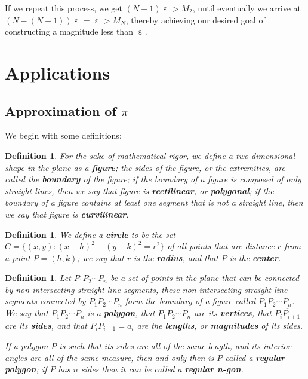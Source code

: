 \documentclass[letterpaper, 12pt]{amsart}
\DeclareMathOperator{\ep}{\varepsilon}
\newtheorem{defn}[thm]{Definition}
\theoremstyle{definition}  %
\begin{document}
		If we repeat this process, we get $(N-1)\ep > M_{2}$, until eventually we arrive at $(N - (N-1))\ep = \ep > M_{N}$, thereby achieving our desired goal of constructing a magnitude less than $\ep$.

	\section{Applications}
	\label{sec:applications}
		\subsection{Approximation of $\pi$}
		\label{sub:approximation_of_pi}
		We begin with some definitions:
		\begin{defn}
		\label{defn:fig}
		For the sake of mathematical rigor, we define a two-dimensional shape in the plane as a \textbf{figure}; the sides of the figure, or the extremities, are called the \textbf{boundary} of the figure; if the boundary of a figure is composed of only straight lines, then we say that figure is \textbf{rectilinear}, or \textbf{polygonal}; if the boundary of a figure contains at least one segment that is not a straight line, then we say that figure is \textbf{curvilinear}.
		\end{defn}

		\begin{defn}
		\label{defn:circle}
		We define a \textbf{circle} to be the set $C = \{ (x,y) : (x - h)^{2} + (y - k)^{2} = r^{2} \}$ of all points that are distance $r$ from a point $P = (h,k)$; we say that $r$ is the \textbf{radius}, and that $P$ is the \textbf{center}.
		\end{defn}

		\begin{defn}
		\label{defn:polygon}
		Let $P_{1}P_{2} \cdots P_{n}$ be a set of points in the plane that can be connected by non-intersecting straight-line segments, these non-intersecting straight-line segments connected by $P_{1}P_{2} \cdots P_{n}$ form the boundary of a figure called $P_{1}P_{2} \cdots P_{n}$.
		We say that $P_{1}P_{2} \cdots P_{n}$ is a \textbf{polygon}, that $P_{1}P_{2} \cdots P_{n}$ are its \textbf{vertices}, that $\overline{P_{i}P_{i+1}}$ are its \textbf{sides}, and that $P_{i}P_{i+1} = a_{i}$ are the \textbf{lengths}, or \textbf{magnitudes} of its sides.

		If a polygon $P$ is such that its sides are all of the same length, and its interior angles are all of the same measure, then and only then is $P$ called a \textbf{regular polygon}; if $P$ has $n$ sides then it can be called a \textbf{regular n-gon}.
		\end{defn}
\end{document}
